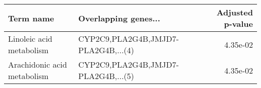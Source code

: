 \begin{tabular}{llr}
\toprule
                  Term name &                Overlapping genes... &  Adjusted p-value \\
\midrule
   Linoleic acid metabolism & CYP2C9,PLA2G4B,JMJD7-PLA2G4B,...(4) &          4.35e-02 \\
Arachidonic acid metabolism & CYP2C9,PLA2G4B,JMJD7-PLA2G4B,...(5) &          4.35e-02 \\
\bottomrule
\end{tabular}
